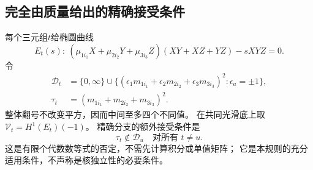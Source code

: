 \documentclass[11pt,a4paper]{ctexart}
\theoremstyle{cnplain}\newtheorem{theorem}{定理}[section]
\theoremstyle{definition}\newtheorem{definition}[theorem]{定义}
\theoremstyle{remark}\newtheorem{remark}[theorem]{注}
\begin{document}
\subsection{完全由质量给出的精确接受条件}
每个三元组$t$给椭圆曲线
\[
 E_t(s):\
 (\mu_{1i_1}X+\mu_{2i_2}Y+\mu_{3i_3}Z)(XY+XZ+YZ)-sXYZ=0.
\]
令
\begin{align}
 \mathcal D_t&=\{0,\infty\}\cup
 \{(\epsilon_1m_{1i_1}+\epsilon_2m_{2i_2}
                       +\epsilon_3m_{3i_3})^2:\epsilon_a=\pm1\},\label{eq:thetadiscr}\\
 \tau_t&=(m_{1i_1}+m_{2i_2}+m_{3i_3})^2 .\nonumber
\end{align}
整体翻号不改变平方，因而中间至多四个不同值。
在共同光滑底上取$\mathcal V_t=H^1(E_t)(-1)$。
精确分支的额外接受条件是
\begin{equation}\label{eq:thetaprivate}
             \tau_t\notin\mathcal D_u\quad\text{对所有 }t\ne u .
\end{equation}
这是有限个代数数等式的否定，不需先计算积分或单值矩阵；
它是本规则的充分适用条件，不声称是核独立性的必要条件。
\end{document}
